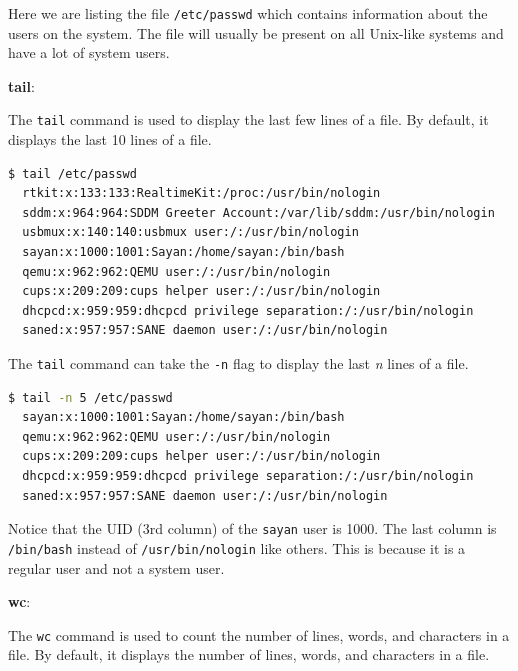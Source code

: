 \begin{remark}
  Here we are listing the file \texttt{/etc/passwd} which contains information about the users on the system.
  The file will usually be present on all Unix-like systems and have a lot of system users.
\end{remark}

\textbf{tail}:

The \texttt{tail} command is used to display the last few lines of a file.
By default, it displays the last 10 lines of a file.

\begin{lstlisting}[language=bash]
  $ tail /etc/passwd
  rtkit:x:133:133:RealtimeKit:/proc:/usr/bin/nologin
  sddm:x:964:964:SDDM Greeter Account:/var/lib/sddm:/usr/bin/nologin
  usbmux:x:140:140:usbmux user:/:/usr/bin/nologin
  sayan:x:1000:1001:Sayan:/home/sayan:/bin/bash
  qemu:x:962:962:QEMU user:/:/usr/bin/nologin
  cups:x:209:209:cups helper user:/:/usr/bin/nologin
  dhcpcd:x:959:959:dhcpcd privilege separation:/:/usr/bin/nologin
  saned:x:957:957:SANE daemon user:/:/usr/bin/nologin
\end{lstlisting}

The \texttt{tail} command can take the \texttt{-n} flag to display the last \textit{n} lines of a file.

\begin{lstlisting}[language=bash]
  $ tail -n 5 /etc/passwd
  sayan:x:1000:1001:Sayan:/home/sayan:/bin/bash
  qemu:x:962:962:QEMU user:/:/usr/bin/nologin
  cups:x:209:209:cups helper user:/:/usr/bin/nologin
  dhcpcd:x:959:959:dhcpcd privilege separation:/:/usr/bin/nologin
  saned:x:957:957:SANE daemon user:/:/usr/bin/nologin
\end{lstlisting}

\begin{exercise}
  Notice that the UID (3rd column) of the \texttt{sayan} user is 1000.
  The last column is \texttt{/bin/bash} instead of \texttt{/usr/bin/nologin} like others.
  This is because it is a regular user and not a system user.
\end{exercise}

\textbf{wc}:

The \texttt{wc} command is used to count the number of lines, words, and characters in a file.
By default, it displays the number of lines, words, and characters in a file.

